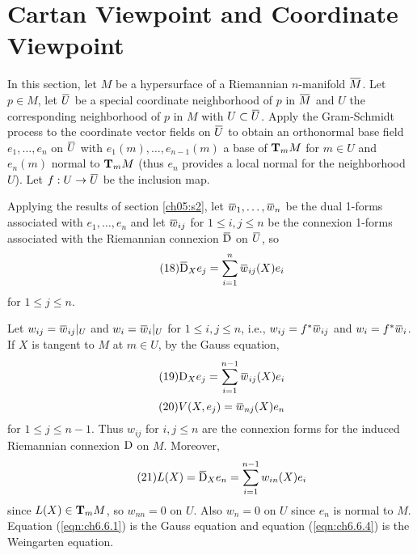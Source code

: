 \documentclass[../main]{subfiles}
\begin{document}
\section{Cartan Viewpoint and Coordinate Viewpoint}\label{ch06:s6}

In this section, let $M$ be a hypersurface of a Riemannian $n$-manifold $\xoverline M$. Let $p\in M$, let $\xoverline U$ be a special coordinate neighborhood of $p$ in $\xoverline M$ and $U$ the corresponding neighborhood of $p$ in $M$ with $U\subset\xoverline U$. Apply the Gram-Schmidt process to the coordinate vector fields on $\xoverline U$ to obtain an orthonormal base field $e_1,\ldots,e_n$ on $\xoverline U$ with $e_1(m),\ldots,e_{n-1}(m)$ a base of $\ts Mm$ for $m\in U$ and $e_n(m)$ normal to $\ts Mm$ (thus $e_n$ provides a local normal for the neighborhood $U$). Let $f:U\functionMaps\xoverline U$ be the inclusion map.

Applying the results of section \ref{ch05:s2}, let $\xoverline w_1,\ldots,\xoverline w_n$ be the dual 1-forms associated with $e_1,\ldots,e_n$ and let $\xoverline w_{ij}$ for $1\le i,j\le n$ be the connexion 1-forms associated with the Riemannian connexion $\covariant$ on $\xoverline U$, so
\begin{equation}\tag{18} \label{eqn:ch6.6.1}
    \covariant_Xe_j = \sum_{i=1}^n \xoverline w_{ij}(X)e_i
\end{equation}
for $1\le j\le n$.

Let $w_{ij}=\xoverline w_{ij}|_U$ and $w_i=\xoverline w_i|_U$ for $1\le i,j\le n$, i.e., $w_{ij}=f^*\xoverline w_{ij}$ and $w_i=f^*\xoverline w_i$. If $X$ is tangent to $M$ at $m\in U$, by the Gauss equation,
\begin{equation} \tag{19}\label{eqn:ch6.6.2}
    \D_Xe_j = \sum_{i=1}^{n-1}\xoverline w_{ij}(X)e_i
\end{equation}
\begin{equation}\tag{20} \label{eqn:ch6.6.3}
    V(X,e_j) = \xoverline w_{nj}(X)e_n
\end{equation}
for $1\le j\le n-1$. Thus $w_{ij}$ for $i,j\le n$ are the connexion forms for the induced Riemannian connexion $\D$ on $M$. Moreover,
\begin{equation}\tag{21} \label{eqn:ch6.6.4}
    L(X) = \covariant_Xe_n = \sum_{i=1}^{n-1} w_{in}(X)e_i
\end{equation}
since $L(X)\in\ts Mm$, so $w_{nn}=0$ on $U$. Also $w_n=0$ on $U$ since $e_n$ is normal to $M$. Equation (\ref{eqn:ch6.6.1}) is the Gauss equation and equation (\ref{eqn:ch6.6.4}) is the Weingarten equation.
\end{document}
